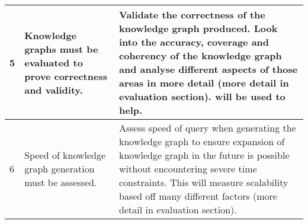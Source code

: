 \begin{longtable}{|p{2.25cm}|p{5.5cm}|p{5.5cm}|}
5&
Knowledge graphs must be evaluated to prove correctness and validity. &
Validate the correctness of the knowledge graph produced. Look into the accuracy, coverage and coherency of the knowledge graph and analyse different aspects of those areas in more detail (more detail in evaluation section). \cite{knowledgegraphevaulationbook} will be used to help. \\ 
\hline

6&
Speed of knowledge graph generation must be assessed. &
Assess speed of query when generating the knowledge graph to ensure expansion of knowledge graph in the future is possible without encountering severe time constraints. This will measure scalability based off many different factors (more detail in evaluation section). 
\hline
\end{longtable}

